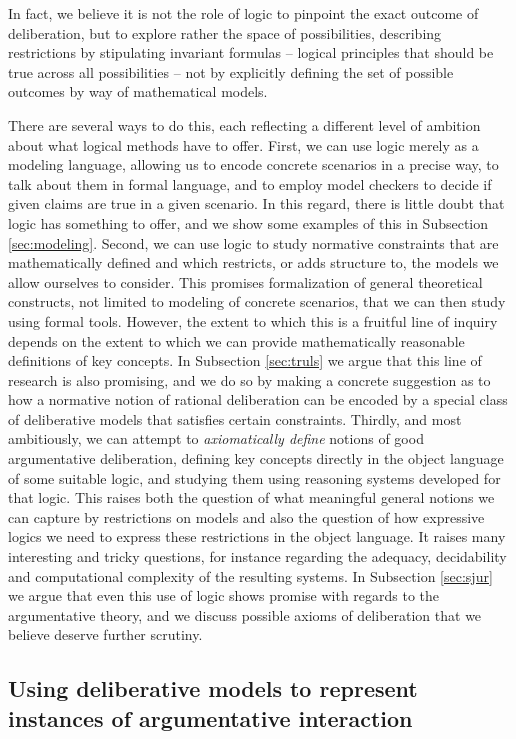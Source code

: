 \documentclass[greybox]{svmult}
\begin{document}
In fact, we believe it is not the role of logic to pinpoint the exact outcome of deliberation, but to explore rather the space of possibilities, describing restrictions by stipulating invariant formulas -- logical principles that should be true across all possibilities -- not by explicitly defining the set of possible outcomes by way of mathematical models.

There are several ways to do this, each reflecting a different level of ambition about what logical methods have to offer. First, we can use logic merely as a modeling language, allowing us to encode concrete scenarios in a precise way, to talk about them in formal language, and to employ model checkers to decide if given claims are true in a given scenario. In this regard, there is little doubt that logic has something to offer, and we show some examples of this in Subsection \ref{sec:modeling}. Second, we can use logic to study normative constraints that are mathematically defined and which restricts, or adds structure to, the models we allow ourselves to consider. This promises formalization of general theoretical constructs, not limited to modeling of concrete scenarios, that we can then study using formal tools. However, the extent to which this is a fruitful line of inquiry depends on the extent to which we can provide mathematically reasonable definitions of key concepts. In Subsection \ref{sec:truls} we argue that this line of research is also promising, and we do so by making a concrete suggestion as to how a normative notion of rational deliberation can be encoded by a special class of deliberative models that satisfies certain constraints. Thirdly, and most ambitiously, we can attempt to \emph{axiomatically define} notions of good argumentative deliberation, defining key concepts directly in the object language of some suitable logic, and studying them using reasoning systems developed for that logic. This raises both the question of what meaningful general notions we can capture by restrictions on models and also the question of how expressive logics we need to express these restrictions in the object language. It raises many interesting and tricky questions, for instance regarding the adequacy, decidability and computational complexity of the resulting systems. In Subsection \ref{sec:sjur} we argue that even this use of logic shows promise with regards to the argumentative theory, and we discuss possible axioms of deliberation that we believe deserve further scrutiny.

\subsection{Using deliberative models to represent instances of argumentative interaction}
\end{document}
